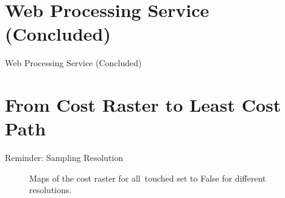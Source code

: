 \documentclass[usenames,dvipsnames,aspectratio=169]{beamer}
\begin{document}
	
	\section{Web Processing Service (Concluded)}
	\begin{frame}{Web Processing Service (Concluded)}
	\centering

	\end{frame}
	
	\section{From Cost Raster to Least Cost Path}
	\begin{frame}{Reminder: Sampling Resolution}
		\begin{figure}
		\centering
		\enskip
		\enskip
		
		\caption{Maps of the cost raster for all~touched set to False for different resolutions.}
		\label{fig:CostAllTouchedFalse}
		\end{figure}
	\end{frame}
\end{document}
